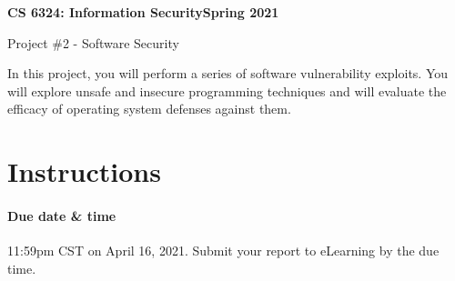\documentclass[11pt]{article}
\begin{document}
\thispagestyle{empty}

\noindent \textbf{CS 6324: Information Security\hspace*{\fill}Spring 2021}
\begin{center}
{\LARGE Project \#2 - Software Security}
\end{center}

In this project, you will perform a series of software vulnerability exploits. You will explore unsafe and insecure programming techniques and will evaluate the efficacy of operating system defenses against them.

\section*{Instructions}

\paragraph{Due date \& time} 11:59pm CST on April 16, 2021.
Submit your report to eLearning by the due time.
\end{document}
